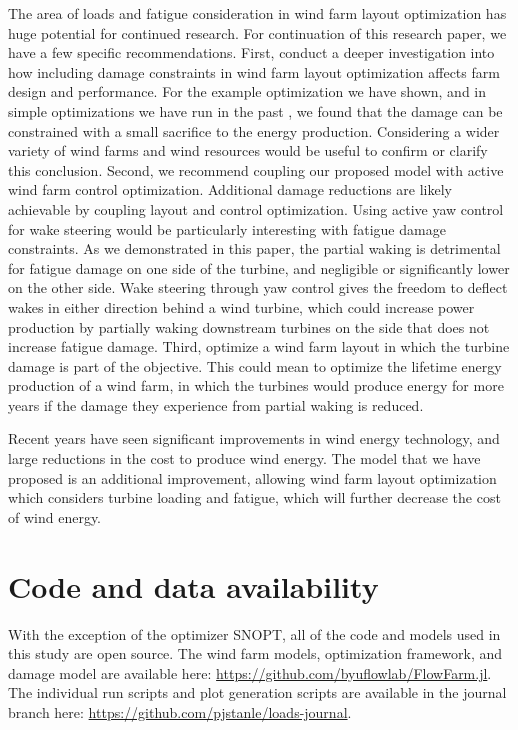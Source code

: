 \documentclass[11pt,letterpaper]{article}
\begin{document}
The area of loads and fatigue consideration in wind farm layout optimization has huge potential for continued research. For continuation of this research paper, we have a few specific recommendations. 
% 
First, conduct a deeper investigation into how including damage constraints in wind farm layout optimization affects farm design and performance. For the example optimization we have shown, and in simple optimizations we have run in the past \cite{stanley2020wind}, we found that the damage can be constrained with a small sacrifice to the energy production. Considering a wider variety of wind farms and wind resources would be useful to confirm or clarify this conclusion.
% 
Second, we recommend coupling our proposed model with active wind farm control optimization. Additional damage reductions are likely achievable by coupling layout and control optimization. Using active yaw control for wake steering would be particularly interesting with fatigue damage constraints. As we demonstrated in this paper, the partial waking is detrimental for fatigue damage on one side of the turbine, and negligible or significantly lower on the other side. Wake steering through yaw control gives the freedom to deflect wakes in either direction behind a wind turbine, which could increase power production by partially waking downstream turbines on the side that does not increase fatigue damage.
% 
Third, optimize a wind farm layout in which the turbine damage is part of the objective. This could mean to optimize the lifetime energy production of a wind farm, in which the turbines would produce energy for more years if the damage they experience from partial waking is reduced.

Recent years have seen significant improvements in wind energy technology, and large reductions in the cost to produce wind energy.
The model that we have proposed is an additional improvement, allowing wind farm layout optimization which considers turbine loading and fatigue, which will further decrease the cost of wind energy. %

\section*{Code and data availability}
With the exception of the optimizer SNOPT, all of the code and models used in this study are open source. The wind farm models, optimization framework, and damage model are available here: \url{https://github.com/byuflowlab/FlowFarm.jl}. The individual run scripts and plot generation scripts are available in the journal branch here: \url{https://github.com/pjstanle/loads-journal}.
\end{document}
